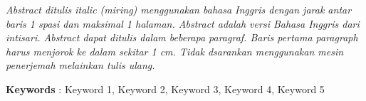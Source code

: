 \textit{
	Abstract ditulis italic (miring) menggunakan bahasa Inggris dengan jarak antar baris 1 spasi dan maksimal 1 halaman. Abstract adalah versi Bahasa Inggris dari intisari. Abstract dapat ditulis dalam beberapa paragraf. Baris pertama paragraph harus menjorok ke dalam sekitar 1 cm. Tidak dsarankan menggunakan mesin penerjemah melainkan tulis ulang.
}

\noindent\textbf{Keywords} : Keyword 1, Keyword 2, Keyword 3, Keyword 4, Keyword 5 